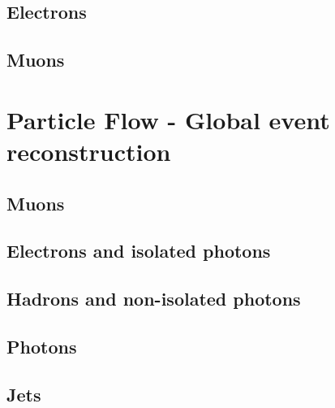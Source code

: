 \subsection{Electrons}


\subsection{Muons}
\label{sec:muonReco}


\section{Particle Flow - Global event reconstruction}
\label{sec:ParticleFlow}


\subsection{Muons}
\label{sec:PFmuo}


\subsection{Electrons and isolated photons}



\subsection{Hadrons and non-isolated photons}


\subsection{Photons}
\label{sec:photons}


\subsection{Jets}
\label{sec:jets}


